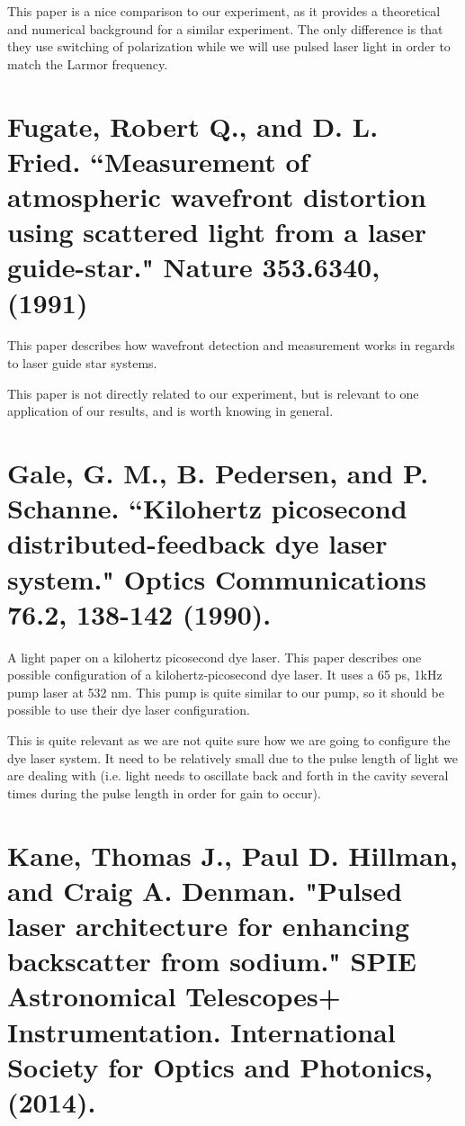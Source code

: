 \documentclass{article}
\begin{document}
This paper is a nice comparison to our experiment, as it provides a theoretical and numerical background for a similar experiment. The only difference is that they use switching of polarization while we will use pulsed laser light in order to match the Larmor frequency.

%

\section*{Fugate, Robert Q., and D. L. Fried. ``Measurement of atmospheric wavefront distortion using scattered light from a laser guide-star." Nature 353.6340, (1991)}
This paper describes how wavefront detection and measurement works in regards to laser guide star systems. 

This paper is not directly related to our experiment, but is relevant to one application of our results, and is worth knowing in general.

%

\section*{Gale, G. M., B. Pedersen, and P. Schanne. ``Kilohertz picosecond distributed-feedback dye laser system." Optics Communications 76.2, 138-142 (1990).}
A light paper on a kilohertz picosecond dye laser.
This paper describes one possible configuration of a kilohertz-picosecond dye laser. It uses a 65 ps, 1kHz pump laser at 532 nm. This pump is quite similar to our pump, so it should be possible to use their dye laser configuration.

This is quite relevant as we are not quite sure how we are going to configure the dye laser system. It need to be relatively small due to the pulse length of light we are dealing with (i.e. light needs to oscillate back and forth in the cavity several times during the pulse length in order for gain to occur).

%

\section*{Kane, Thomas J., Paul D. Hillman, and Craig A. Denman. "Pulsed laser architecture for enhancing backscatter from sodium." SPIE Astronomical Telescopes+ Instrumentation. International Society for Optics and Photonics, (2014).}
\end{document}
